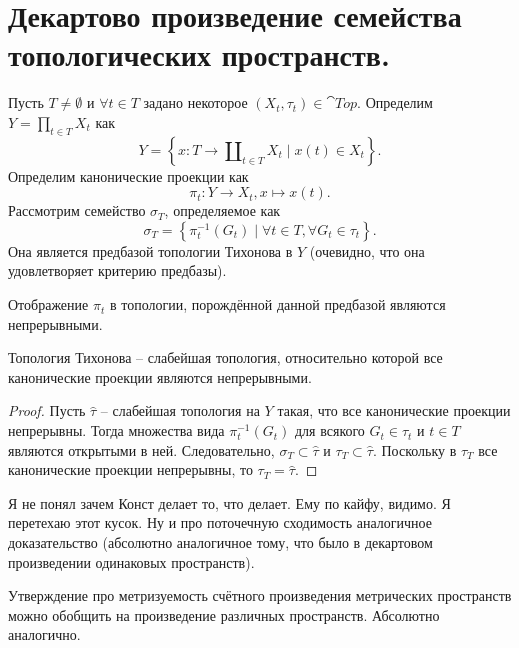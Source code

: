 \section{Декартово произведение семейства топологических пространств.}
\begin{definition}
    Пусть $T \neq \emptyset$ и $\forall t \in T$ задано некоторое $(X_t, \tau_t) \in \cat{Top}$.
    Определим $Y = \prod_{t \in T} X_t$ как
    \[
        Y = \left\{x\colon T \to \amalg_{t \in T} X_t \mid x(t)\in X_t \right\}.
    \]
    Определим канонические проекции как
    \[
        \pi_t\colon Y \to X_t, x \mapsto x(t).
    \]
    Рассмотрим семейство $\sigma_T$, определяемое как
    \[
        \sigma_T = \left\{\pi^{-1}_t(G_t) \mid \forall t \in T, \forall G_t \in \tau_t\right\}.
    \]
    Она является предбазой топологии Тихонова в $Y$ (очевидно, что она удовлетворяет критерию предбазы).

    Отображение $\pi_t$ в топологии, порождённой данной предбазой являются непрерывными.
\end{definition}
\begin{proposition}
    Топология Тихонова -- слабейшая топология, относительно которой все канонические проекции являются непрерывными.
\end{proposition}
\begin{proof}
    Пусть $\hat{\tau}$ -- слабейшая топология на $Y$ такая, что все канонические проекции непрерывны.
    Тогда множества вида $\pi^{-1}_t(G_t)$ для всякого $G_t \in \tau_t$ и $t \in T$ являются открытыми в ней.
    Следовательно, $\sigma_T \subset \hat{\tau}$ и $\tau_T \subset \hat{\tau}$.
    Поскольку в $\tau_T$ все канонические проекции непрерывны, то $\tau_T = \hat{\tau}$.
\end{proof}
\begin{notet}
    Я не понял зачем Конст делает то, что делает.
    Ему по кайфу, видимо.
    Я перетехаю этот кусок.
    Ну и про поточечную сходимость аналогичное доказательство (абсолютно аналогичное тому, что было в декартовом произведении одинаковых пространств).
\end{notet}
\begin{note}
    Утверждение про метризуемость счётного произведения метрических пространств можно обобщить на произведение различных пространств.
    Абсолютно аналогично.
\end{note}

